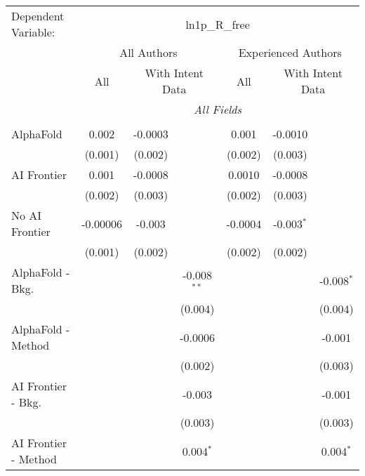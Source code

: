 \begingroup
\centering
\begin{tabular}{lcccccc}
   \tabularnewline \midrule \midrule
   Dependent Variable: & \multicolumn{6}{c}{ln1p\_R\_free}\\
 & \multicolumn{3}{c}{All Authors} & \multicolumn{3}{c}{Experienced Authors} \\
\cmidrule(lr){2-4} \cmidrule(lr){5-7}
 & \multicolumn{1}{c}{All} & \multicolumn{2}{c}{With Intent Data} & \multicolumn{1}{c}{All} & \multicolumn{2}{c}{With Intent Data} \\
\cmidrule(lr){2-2} \cmidrule(lr){3-4} \cmidrule(lr){5-5} \cmidrule(lr){6-7}
 & \multicolumn{6}{c}{\textit{All Fields}} \\ \\
   AlphaFold               & 0.002    & -0.0003 &               & 0.001   & -0.0010      &   \\   
                           & (0.001)  & (0.002) &               & (0.002) & (0.003)      &   \\   
   AI Frontier             & 0.001    & -0.0008 &               & 0.0010  & -0.0008      &   \\   
                           & (0.002)  & (0.003) &               & (0.002) & (0.003)      &   \\   
   No AI Frontier          & -0.00006 & -0.003  &               & -0.0004 & -0.003$^{*}$ &   \\   
                           & (0.001)  & (0.002) &               & (0.002) & (0.002)      &   \\   
   AlphaFold - Bkg.        &          &         & -0.008$^{**}$ &         &              & -0.008$^{*}$\\   
                           &          &         & (0.004)       &         &              & (0.004)\\   
   AlphaFold - Method      &          &         & -0.0006       &         &              & -0.001\\   
                           &          &         & (0.002)       &         &              & (0.003)\\   
   AI Frontier - Bkg.      &          &         & -0.003        &         &              & -0.001\\   
                           &          &         & (0.003)       &         &              & (0.003)\\   
   AI Frontier - Method    &          &         & 0.004$^{*}$   &         &              & 0.004$^{*}$\\   

\end{tabular}
